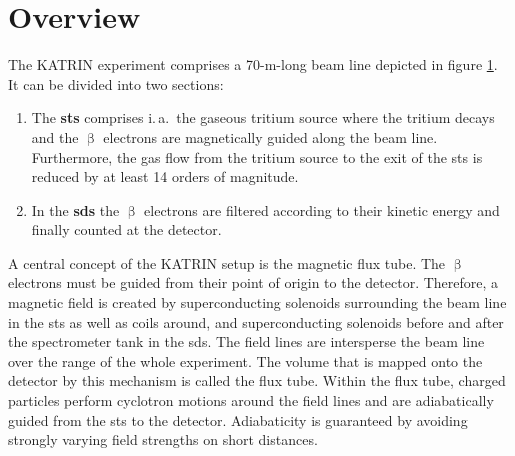 \section{Overview}
\label{sec:katrinExpSetupOverview}
\begin{figure}[t]
	\label{fig:katrinExpSetupBeamline}
\end{figure}
The KATRIN experiment comprises a 70-m-long beam line depicted in figure \ref{fig:katrinExpSetupBeamline}. It can be divided into two sections: 
\begin{enumerate}
	\item The \textbf{\gls{sts}} comprises i.\,a.~the gaseous tritium source where the tritium decays and the $\upbeta$ electrons are magnetically guided along the beam line. Furthermore, the gas flow from the tritium source to the exit of the \gls{sts} is reduced by at least 14 orders of magnitude.
	\item In the \textbf{\gls{sds}} the $\upbeta$ electrons are filtered according to their kinetic energy and finally counted at the detector.
\end{enumerate}
A central concept of the KATRIN setup is the magnetic flux tube. The $\upbeta$ electrons must be guided from their point of origin to the detector. Therefore, a magnetic field is created by superconducting solenoids surrounding the beam line in the \gls{sts} as well as coils around, and superconducting solenoids before and after the spectrometer tank in the \gls{sds}. The field lines are intersperse the beam line over the range of the whole experiment. The volume that is mapped onto the detector by this mechanism is called the flux tube. Within the flux tube, charged particles perform cyclotron motions around the field lines and are adiabatically guided from the \gls{sts} to the detector. Adiabaticity is guaranteed by avoiding strongly varying field strengths on short distances. 

